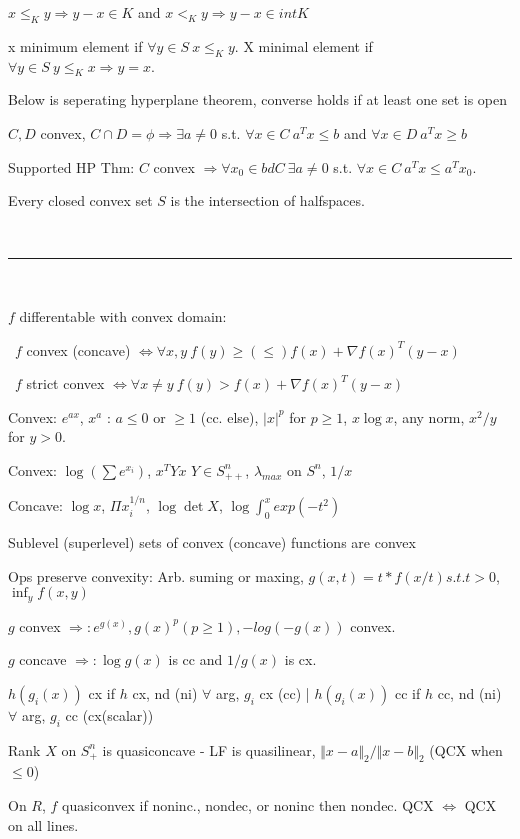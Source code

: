 \documentclass[10pt,twocolumn]{report}
\begin{document}
$x \le_K y \Rightarrow y-x \in K$ and $x <_K y \Rightarrow y - x \in int K$

x minimum element if $\forall y \in S ~ x \le_K y $. X minimal element if $\forall y \in S ~ y \le_K x \Rightarrow y = x$.

Below is seperating hyperplane theorem, converse holds if at least one set is open

$C,D$ convex, $C\cap D = \phi \Rightarrow \exists a \ne 0$ s.t. $\forall x \in C ~ a^Tx\le b$ and $\forall x \in D ~ a^Tx \ge b$ 

Supported HP Thm: $C$ convex $\Rightarrow \forall x_0 \in bd C ~ \exists a \ne 0$ s.t. $\forall x \in C ~ a^Tx \le a^Tx_0$.

Every closed convex set $S$ is the intersection of halfspaces.

~

\hrule

~

$f$ differentable with convex domain: 

~$f$ convex (concave) $\iff \forall x,y ~ f(y) \ge (\le) f(x) + \nabla f(x)^T(y-x)$

~$f$ strict convex $\iff \forall x \ne y ~ f(y) > f(x) + \nabla f(x)^T(y-x)$

Convex: $e^{ax}$, $x^a$ : $a \le 0$ or $\ge 1$ (cc. else), $|x|^p$ for $p \ge 1$, $x \log x$, any norm, $x^2/y$ for $y > 0$.

Convex: $\log(\sum e^{x_i})$, $x^TYx$ $Y \in S^n_{++}$, $\lambda_{max}$ on $S^n$, $1/x$

Concave: $\log x$, $\Pi x_i^{1/n}$, $\log \det X$, $\log \int_0^x exp(-t^2)$

Sublevel (superlevel) sets of convex (concave) functions are convex

Ops preserve convexity: Arb. suming or maxing, $g(x,t) = t*f(x/t) s.t. t > 0$,  $\inf_y f(x,y)$

$g$ convex $\Rightarrow: e^{g(x)}, g(x)^p (p\ge 1), -log(-g(x))$ convex.

$g$ concave $\Rightarrow: \log g(x)$ is cc and $1/g(x)$ is cx.

$h(g_i(x))$ cx if $h$ cx, nd (ni) $\forall$ arg, $g_i$ cx (cc) | $h(g_i(x))$ cc if $h$ cc, nd (ni) $\forall$ arg, $g_i$ cc (cx(scalar))

Rank $X$ on $S^n_+$ is quasiconcave - LF is quasilinear, $\Vert x - a\Vert_2/\Vert x - b\Vert_2$ (QCX when $\le 0$)

On $R$, $f$ quasiconvex if noninc., nondec, or noninc then nondec. QCX $\iff$ QCX on all lines.
\end{document}
